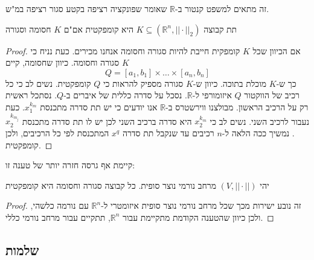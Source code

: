 \documentclass{tstextbook}
\begin{document}
\begin{remark}
זה מתאים למשפט קנטור ב-\(\mathbb{R}\) שאומר שפונקציה רציפה בקטע סגור רציפה במ"ש.

\end{remark}
\begin{theorem}
תת קבוצה \(K\subseteq\left( \mathbb{R} ^n,||\cdot||_{2} \right)\) היא קומפקטית אם"ם \(K\) חסומה וסגורה

\end{theorem}
\begin{proof}
אם הכיוון שכל \(K\) קומפקית חייבת להיות סגורה וחסומה אנחנו מכירים. כעת נניח כי \(K\) סגורה וחסומה. כיוון שחסומה, קיים $$Q=[a_{1},b_{1}]\times\ldots\times[a_{n},b_{n}]$$
כך ש-\(K\) מוכלת בתוכה. כיוון ש-\(K\) סגורה מספיק להראות כי \(Q\) קומפקטית. נשים לב כי כל רכיב של הווקטור \(Q\) איזומורפי ל-\(\mathbb{R}\). נסכל על סדרה כללית של איברים ב-\(Q\). נסתכל ראשית רק על הרכיב הראשון. מבולצנו ווירשטרס ב-\(\mathbb{R}\) אנו יודעים כי יש תת סדרה מתכנסת \(x_{1}^{k_{m}}\). כעת נעבור לרכיב השני. נשים לב כי \(x_{2}^{k_{m}}\) היא סדרה ברכיב השני לכן יש לו תת סדרה מתכנסת \(x_{2}^{k_{m_{j}}}\). נמשיך ככה הלאה ל-\(n\) רכיבים עד שנקבל תת סדרה \(x^{q}\) המתכנסת לפי כל הרכיבים, ולכן קומפקטית.

\end{proof}
קיימת אף גרסה חזרה יותר של טענה זו:

\begin{proposition}
יהי \(\left( V,||\cdot|| \right)\) מרחב נורמי נוצר סופית. כל קבוצה סגורה וחסומה היא קומפקטית

\end{proposition}
\begin{proof}
זה נובע ישירות מכך שכל מרחב נורמי נוצר סופית איזומטרי ל-\(\mathbb{R}^n\) עם נורמה כלשהי, ולכן כיוון שהטענה הקודמת מתקיימת עבור \(\mathbb{R}^n\), תתקיים עבור מרחב נורמי כללי.

\end{proof}
\subsection{שלמות}
\end{document}

